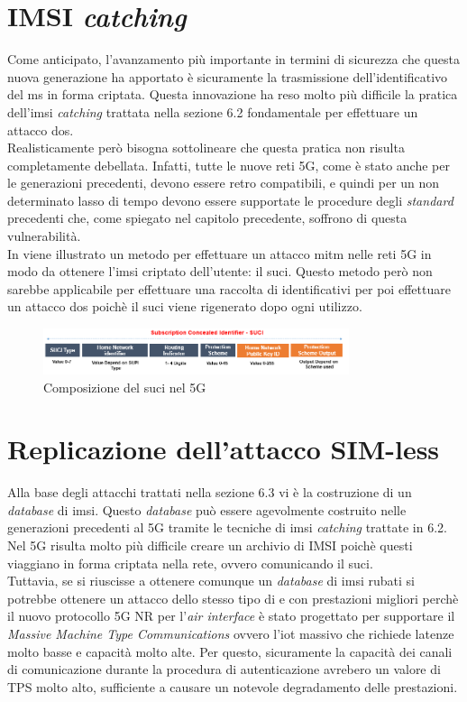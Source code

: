 \section{IMSI \textit{catching}}
Come anticipato, l'avanzamento più importante in termini di sicurezza che questa nuova generazione ha apportato è sicuramente la trasmissione dell'identificativo del \gls{ms} in forma 
criptata. Questa innovazione ha reso molto più difficile la pratica dell'\gls{imsi} \textit{catching} trattata nella sezione 6.2 fondamentale per effettuare un attacco \gls{dos}.\\
Realisticamente però bisogna sottolineare che questa pratica non risulta completamente debellata. Infatti, tutte le nuove reti 5G, come è stato anche per le generazioni precedenti, devono 
essere retro compatibili, e quindi per un non determinato lasso di tempo devono essere supportate le procedure degli \textit{standard} precedenti che, come spiegato nel capitolo precedente, soffrono 
di questa vulnerabilità.\\
In \cite{suci-catch} viene illustrato un metodo per effettuare un attacco \gls{mitm} nelle reti 5G in modo da ottenere l'\gls{imsi} criptato dell'utente: il \gls{suci}. Questo metodo però non sarebbe applicabile per effettuare 
una raccolta di identificativi per poi effettuare un attacco \gls{dos} poichè il \gls{suci} viene rigenerato dopo ogni utilizzo.
\begin{figure}[ht]
    \centering
    \includegraphics[width=0.8\textwidth]{images/5g-suci.png}
    \caption{Composizione del \gls{suci} nel 5G}
\end{figure}

\section{Replicazione dell'attacco SIM-less}
Alla base degli attacchi trattati nella sezione 6.3 vi è la costruzione di un \textit{database} di \gls{imsi}. Questo \textit{database} può essere agevolmente costruito nelle generazioni precedenti al 5G 
tramite le tecniche di \gls{imsi} \textit{catching} trattate in 6.2. Nel 5G risulta molto più difficile creare un archivio di IMSI poichè questi viaggiano in forma criptata nella rete, ovvero comunicando il \gls{suci}.\\
Tuttavia, se si riuscisse a ottenere comunque un \textit{database} di \gls{imsi} rubati si potrebbe ottenere un attacco dello stesso tipo di \cite{gsm-dos-simless} e \cite{umts-dos} con prestazioni migliori 
perchè il nuovo protocollo 5G NR\cite{5g-nr} per l'\textit{air interface} è stato progettato per supportare il \textit{Massive Machine Type Communications} ovvero l'\gls{iot} massivo che richiede latenze molto basse e capacità molto alte.
Per questo, sicuramente la capacità dei canali di comunicazione durante la procedura di autenticazione avrebero un valore di TPS molto alto, sufficiente a causare un notevole degradamento delle prestazioni.

